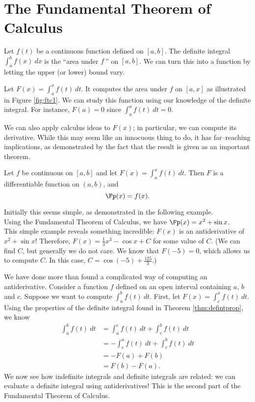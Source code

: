 \section{The Fundamental Theorem of Calculus}\label{sec:FTC}

Let $f(t)$ be a continuous function defined on $[a,b]$. The definite integral $\int_a^b f(x)\ dx$ is the ``area under $f\ $'' on $[a,b]$. We can turn this into a function by letting the upper (or lower) bound vary.

Let $F(x) = \int_a^x f(t)\ dt$. It computes the area under $f$ on $[a,x]$ as illustrated in Figure \ref{fig:ftc1}. We can study this function using our knowledge of the definite integral. For instance, $F(a)=0$ since $\int_a^af(t)\ dt=0$. %


We can also apply calculus ideas to $F(x)$; in particular, we can compute its derivative. While this may seem like an innocuous thing to do, it has far--reaching implications, as demonstrated by the fact that the result is given as an important theorem.

{Let $f$ be continuous on $[a,b]$ and let $F(x) = \int_a^x f(t)\ dt$. Then $F$ is a differentiable function on $(a,b)$, and $$\Fp(x)=f(x).$$
}

Initially this seems simple, as demonstrated in the following example.\\

{Using the Fundamental Theorem of Calculus, we have $\Fp(x) = x^2+\sin x$.
}\\

This simple example reveals something incredible: $F(x)$ is an antiderivative of $x^2+\sin x$! Therefore, $F(x) = \frac13x^3-\cos x+C$ for some value of $C$. (We can find $C$, but generally we do not care. We know that $F(-5)=0$, which allows us to compute $C$. In this case, $C=\cos(-5)+\frac{125}3$.)

We have done more than found a complicated way of computing an antiderivative. Consider a function $f$ defined on an open interval containing $a$, $b$ and $c$. Suppose we want to compute $\int_a^b f(t)\ dt$. First, let $F(x) = \int_c^x f(t)\ dt$. Using the properties of the definite integral found in Theorem \ref{thm:defintprop}, we know 
		\begin{align*}\int_a^b f(t)\ dt &= \int_a^c f(t)\ dt + \int_c^b f(t)\ dt \\
											&= -\int_c^a f(t)\ dt + \int_c^b f(t)\ dt \\
											&=-F(a) + F(b)\\
											&= F(b) - F(a).
		\end{align*}
We now see how indefinite integrals and definite integrals are related: we can evaluate a definite integral using antiderivatives! This is the second part of the Fundamental Theorem of Calculus.

